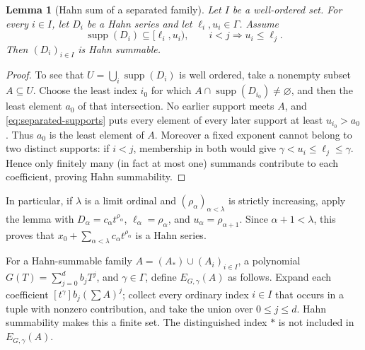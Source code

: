 \documentclass[11pt]{article}
\newcommand{\Supp}{\operatorname{supp}}
\theoremstyle{proofnote}
\newtheorem{lemma}[theorem]{Lemma}
\begin{document}
\begin{lemma}[Hahn sum of a separated family]
\label{lem:ordinal-hahn-sum}
  Let \(I\) be a well-ordered set.  For every \(i\in I\), let \(D_i\) be a
  Hahn series and let \(\ell_i,u_i\in\Gamma\).  Assume
  \[
    \Supp(D_i)\subseteq[\ell_i,u_i),
    \qquad i<j\Longrightarrow u_i\le\ell_j.
    \tag{SS}\label{eq:separated-supports}
  \]
  Then \((D_i)_{i\in I}\) is Hahn summable.
\end{lemma}
\begin{proof}
  To see that \(U=\bigcup_i\Supp(D_i)\) is well ordered, take a nonempty
  subset \(A\subseteq U\).  Choose the least index \(i_0\) for which
  \(A\cap\Supp(D_{i_0})\ne\varnothing\), and then the least element \(a_0\)
  of that intersection.  No earlier support meets \(A\), and
  \eqref{eq:separated-supports} puts every element of every later support at
  least \(u_{i_0}>a_0\).  Thus \(a_0\) is the least element of \(A\).
  Moreover a fixed exponent cannot belong to two distinct supports: if
  \(i<j\), membership in both would give
  \(\gamma<u_i\le\ell_j\le\gamma\).  Hence only finitely many (in fact at
  most one) summands contribute to each coefficient, proving Hahn
  summability.
\end{proof}

In particular, if \(\lambda\) is a limit ordinal and
\((\rho_\alpha)_{\alpha<\lambda}\) is strictly increasing, apply the lemma
with \(D_\alpha=c_\alpha t^{\rho_\alpha}\),
\(\ell_\alpha=\rho_\alpha\), and
\(u_\alpha=\rho_{\alpha+1}\).  Since \(\alpha+1<\lambda\), this proves that
\(x_0+\sum_{\alpha<\lambda}c_\alpha t^{\rho_\alpha}\) is a Hahn series.

For a Hahn-summable family \(A=(A_*)\cup(A_i)_{i\in I}\), a polynomial
\(G(T)=\sum_{j=0}^d b_jT^j\), and \(\gamma\in\Gamma\), define
\(E_{G,\gamma}(A)\) as follows.  Expand each coefficient
\([t^\gamma]b_j(\sum A)^j\); collect every ordinary index \(i\in I\) that
occurs in a tuple with nonzero contribution, and take the union over
\(0\le j\le d\).  Hahn summability makes this a finite set.  The
distinguished index \(*\) is not included in \(E_{G,\gamma}(A)\).
\end{document}
